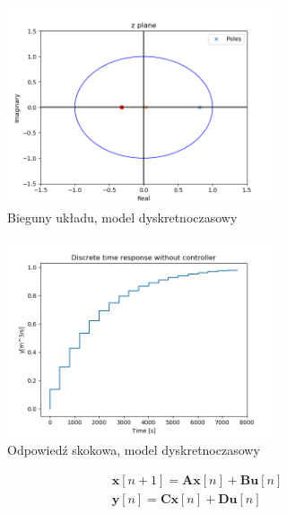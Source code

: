 \documentclass{article}
\begin{document}
\begin{figure}[H]
    \centering
    \includegraphics[width=0.7\textwidth]{img/disc_poles.png}
    \caption{Bieguny układu, model dyskretnoczasowy}
    \label{fig:disc_poles}
\end{figure}

\begin{figure}[H]
    \centering
    \includegraphics[width=0.7\textwidth]{img/step_resp_disc.png}
    \caption{Odpowiedź skokowa, model dyskretnoczasowy}
    \label{fig:step_resp_disc}
\end{figure}




\begin{equation}\label{eq:stan_disc}
 \begin{array}{l}
  \mathbf{x}[n+1] = \mathbf{A}\mathbf{x}[n] + \mathbf{B}\mathbf{u}[n] \\
  \mathbf{y}[n]= \mathbf{C} \mathbf{x}[n] + \mathbf{D}\mathbf{u}[n]
\end{array}
\end{equation}
\end{document}
